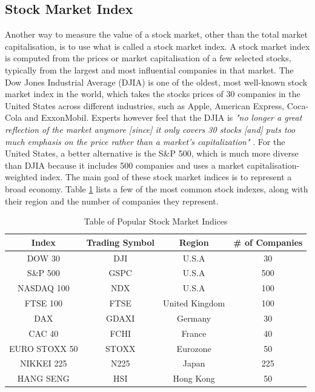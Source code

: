 \documentclass{UoYCSproject}
\begin{document}
\subsection{Stock Market Index}
Another way to measure the value of a stock market, other than the total market capitalisation, is to use what is called a stock market index. A stock market index is computed from the prices or market capitalisation of a few selected stocks, typically from the largest and most influential companies in that market. The Dow Jones Industrial Average (DJIA) is one of the oldest, most well-known stock market index in the world, which takes the stocks prices of 30 companies in the United States across different industries, such as Apple, American Express, Coca-Cola and ExxonMobil. Experts however feel that the DJIA is \textit{"no longer a great reflection of the market anymore [since] it only covers 30 stocks [and] puts too much emphasis on the price rather than a market's capitalization"} \cite{dowproblem}. For the United States, a better alternative is the S\&P 500, which is much more diverse than DJIA because it includes 500 companies and uses a market capitalisation-weighted index. The main goal of these stock market indices is to represent a broad economy. Table \ref{tab:indices} lists a few of the most common stock indexes, along with their region and the number of companies they represent. 

\begin{table}[h]
    \centering
    \begin{tabular}{|c|c|c|c|} \hline
        \textbf{Index} & \textbf{Trading Symbol} & \textbf{Region} & \textbf{\# of Companies} \\ \hline
        DOW 30 & DJI & U.S.A & 30 \\
        S\&P 500 & GSPC & U.S.A & 500 \\
        NASDAQ 100 & NDX & U.S.A & 100 \\
        FTSE 100 & FTSE & United Kingdom & 100 \\
        DAX & GDAXI & Germany & 30 \\
        CAC 40 & FCHI & France & 40 \\
        EURO STOXX 50 & STOXX & Eurozone & 50 \\
        NIKKEI 225 & N225 & Japan & 225 \\
        HANG SENG & HSI & Hong Kong & 50 \\
        \hline
    \end{tabular}
    \caption{Table of Popular Stock Market Indices}
    \label{tab:indices}
\end{table}
\end{document}
